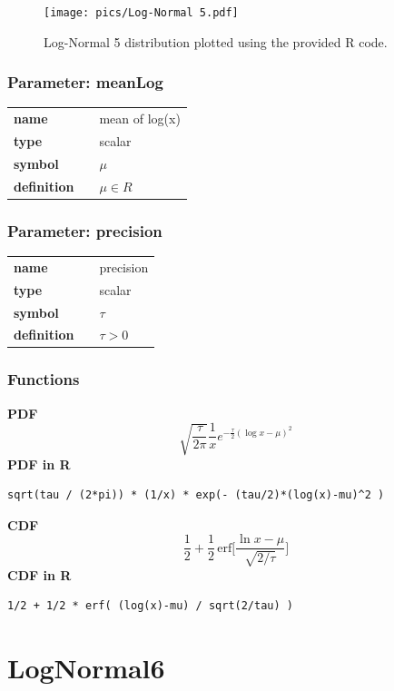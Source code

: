 \documentclass{article}
\begin{document}
\begin{figure}[ht!]
\centering
  \texttt{[image: pics/Log-Normal 5.pdf]}
 \caption{Log-Normal 5 distribution plotted using the provided R code.}
 \label{fig:Log-Normal 5}
\end{figure}

\subsubsection*{Parameter: meanLog}

\noindent\begin{tabular}{p{2cm}cl}
\textbf{name} & & mean of log(x) \\
\textbf{type} & & scalar \\
\textbf{symbol} & & $\mu$  \\
\textbf{definition} & & $\mu \in R$
\end{tabular}
\subsubsection*{Parameter: precision}

\noindent\begin{tabular}{p{2cm}cl}
\textbf{name} & & precision \\
\textbf{type} & & scalar \\
\textbf{symbol} & & $\tau$  \\
\textbf{definition} & & $\tau > 0$
\end{tabular}
\subsubsection*{Functions}

\smallskip \noindent \hspace{.2cm} \textbf{PDF} 
\begin{equation*}\sqrt{\frac{\tau}{2 \pi}} \frac{1}{x}e^{-\frac{\tau}{2}(\log x-\mu)^2}\end{equation*}
\smallskip \noindent \hspace{.2cm} \textbf{PDF in R}  
\begin{verbatim}sqrt(tau / (2*pi)) * (1/x) * exp(- (tau/2)*(log(x)-mu)^2 )\end{verbatim}
\smallskip \noindent \hspace{.2cm} \textbf{CDF} 
\begin{equation*}\frac12 + \frac12\,\text{erf}\Big[\frac{\ln x-\mu}{\sqrt{2/\tau}}\Big]\end{equation*}
\smallskip \noindent \hspace{.2cm} \textbf{CDF in R} 
\begin{verbatim}1/2 + 1/2 * erf( (log(x)-mu) / sqrt(2/tau) )\end{verbatim}
\smallskip\section*{LogNormal6} 
\end{document}
